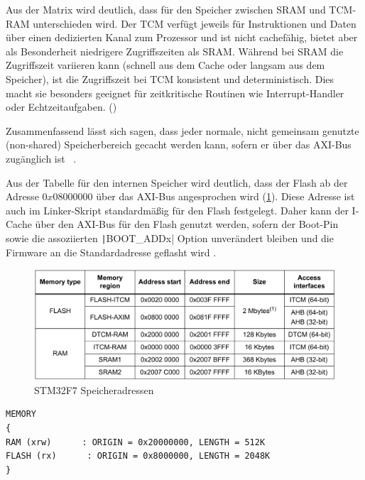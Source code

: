 Aus der Matrix wird deutlich, dass für den Speicher zwischen SRAM und TCM-RAM
unterschieden wird. Der \ac{TCM} verfügt jeweils für Instruktionen und Daten
über einen dedizierten Kanal zum Prozessor und ist nicht cachefähig, bietet aber
als Besonderheit niedrigere Zugriffszeiten als SRAM. Während bei SRAM die
Zugriffszeit variieren kann (schnell aus dem Cache oder langsam aus dem
Speicher), ist die Zugriffszeit bei TCM konsistent und deterministisch.
Dies macht sie besonders geeignet für zeitkritische Routinen wie Interrupt-Handler
oder Echtzeitaufgaben. (\cite{arm_den0042}) %

Zusammenfassend lässt sich sagen, dass jeder normale, nicht gemeinsam genutzte
(non-shared) Speicherbereich gecacht werden kann, sofern er über das AXI-Bus
zugänglich ist \cite[S. 4]{an4839}~\cite[S. 7]{an4667}.

Aus der Tabelle für den internen Speicher wird deutlich, dass der Flash ab der
Adresse $0x0800 0000$ über das AXI-Bus angesprochen wird
(\ref{fig:internal_mem_table}). Diese Adresse ist auch im Linker-Skript
standardmäßig für den Flash festgelegt. Daher kann der I-Cache über den AXI-Bus
für den Flash genutzt werden, sofern der Boot-Pin sowie die assoziierten
\texttt|BOOT_ADDx| Option unverändert bleiben und die Firmware an die
Standardadresse geflasht wird \cite[S. 28]{stm32_datasheet}.

\begin{figure}[htb]
    \centering
    \includegraphics[width=1\textwidth]{assets/internal_mem_table}
    \caption{STM32F7 Speicheradressen \cite[S. 14]{an4667}}
    \label{fig:internal_mem_table}
\end{figure}

\begin{code}
\begin{verbatim}
MEMORY
{
RAM (xrw)      : ORIGIN = 0x20000000, LENGTH = 512K
FLASH (rx)      : ORIGIN = 0x8000000, LENGTH = 2048K
}
\end{verbatim}
\end{code}

